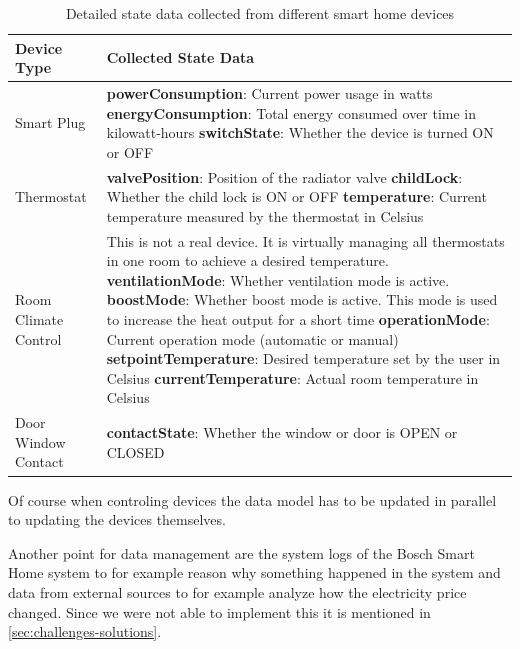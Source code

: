 \begin{table}[h!]
    \centering
    \begin{tabularx}{\textwidth}{|p{3cm}|X|}
    \hline
    \textbf{Device Type} & \textbf{Collected State Data} \\ \hline
    Smart Plug & 
    \textbf{powerConsumption}: Current power usage in watts \newline
    \textbf{energyConsumption}: Total energy consumed over time in kilowatt-hours \newline
    \textbf{switchState}: Whether the device is turned ON or OFF \\ \hline
    Thermostat & 
    \textbf{valvePosition}: Position of the radiator valve \newline
    \textbf{childLock}: Whether the child lock is ON or OFF \newline
    \textbf{temperature}: Current temperature measured by the thermostat in Celsius \\ \hline
    Room Climate Control & 
    This is not a real device. It is virtually managing all thermostats in one room to achieve a desired temperature.
    \textbf{ventilationMode}: Whether ventilation mode is active. \newline
    \textbf{boostMode}: Whether boost mode is active. This mode is used to increase the heat output for a short time \newline
    \textbf{operationMode}: Current operation mode (automatic or manual) \newline
    \textbf{setpointTemperature}: Desired temperature set by the user in Celsius \newline
    \textbf{currentTemperature}: Actual room temperature in Celsius \\ \hline
    Door Window Contact & 
    \textbf{contactState}: Whether the window or door is OPEN or CLOSED \\ \hline
    \end{tabularx}
    \caption{Detailed state data collected from different smart home devices}
    \label{tab:device_state_data_detailed}
\end{table}

Of course when controling devices the data model has to be updated in parallel to updating the devices themselves.

Another point for data management are the system logs of the Bosch Smart Home system to for example reason why something happened in the system and data from external sources to for example analyze how the electricity price changed.
Since we were not able to implement this it is mentioned in \cref{sec:challenges-solutions}.


